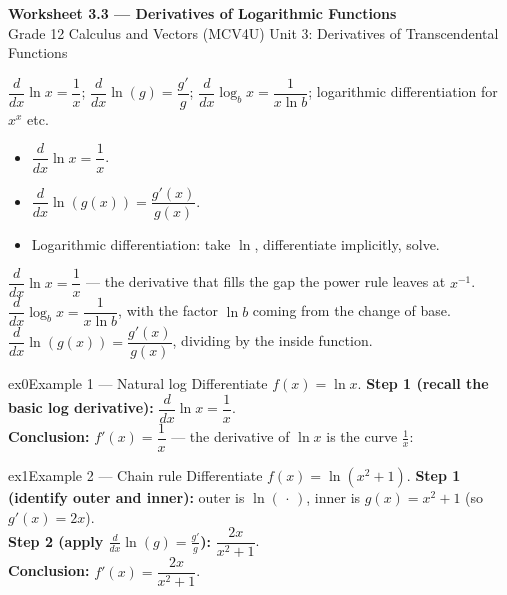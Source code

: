\documentclass[11pt]{article}
\begin{document}
\begin{center}
{\LARGE\bfseries\color{titleblue}Worksheet 3.3 --- Derivatives of Logarithmic Functions}\\[2pt]
{\small Grade 12 Calculus and Vectors (MCV4U) \textperiodcentered{} Unit 3: Derivatives of Transcendental Functions}
\end{center}

\begin{ideabox}
$\dfrac{d}{dx}\ln x=\dfrac1x$; $\dfrac{d}{dx}\ln(g)=\dfrac{g'}{g}$; $\dfrac{d}{dx}\log_b x=\dfrac1{x\ln b}$; logarithmic differentiation for $x^x$ etc.
\begin{itemize}[leftmargin=*,itemsep=2pt]
  \item $\dfrac{d}{dx}\ln x=\dfrac1x$.
  \item $\dfrac{d}{dx}\ln(g(x))=\dfrac{g'(x)}{g(x)}$.
  \item Logarithmic differentiation: take $\ln$, differentiate implicitly, solve.
\end{itemize}
\end{ideabox}

\begin{learnbox}
$\dfrac{d}{dx}\ln x=\dfrac{1}{x}$ — the derivative that fills the gap the power rule leaves at $x^{-1}$.
$\dfrac{d}{dx}\log_b x=\dfrac{1}{x\ln b}$, with the factor $\ln b$ coming from the change of base.
$\dfrac{d}{dx}\ln(g(x))=\dfrac{g'(x)}{g(x)}$, dividing by the inside function.
\end{learnbox}


\begin{example}{ex0}{Example 1 --- Natural log}
Differentiate $f(x)=\ln x$.\soln
\textbf{Step 1 (recall the basic log derivative):} $\dfrac{d}{dx}\ln x=\dfrac1x$.\\[3pt]
\textbf{Conclusion:} $f'(x)=\dfrac1x$ --- the derivative of $\ln x$ is the curve $\tfrac1x$:
\end{example}

\begin{example}{ex1}{Example 2 --- Chain rule}
Differentiate $f(x)=\ln(x^2+1)$.\soln
\textbf{Step 1 (identify outer and inner):} outer is $\ln(\,\cdot\,)$, inner is $g(x)=x^2+1$ (so $g'(x)=2x$).\\[3pt]
\textbf{Step 2 (apply $\frac{d}{dx}\ln(g)=\frac{g'}{g}$):} $\dfrac{2x}{x^2+1}$.\\[3pt]
\textbf{Conclusion:} $f'(x)=\dfrac{2x}{x^2+1}$.
\end{example}
\end{document}
